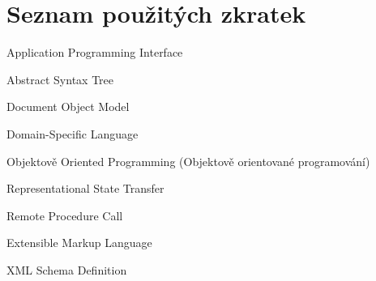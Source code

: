 \usepackage[T1]{fontenc}
\usepackage[utf8]{inputenc}


\chapter{Seznam použitých zkratek}

\begin{description}[align=left]
    \item [API] Application Programming Interface
    \item [AST] Abstract Syntax Tree
    \item [DOM] Document Object Model
    \item [DSL] Domain-Specific Language
    \item [OOP] Objektově Oriented Programming (Objektově orientované programování)
    \item [REST] Representational State Transfer
    \item [RPC] Remote Procedure Call
    \item [XML] Extensible Markup Language
    \item [XSD] XML Schema Definition
\end{description}
